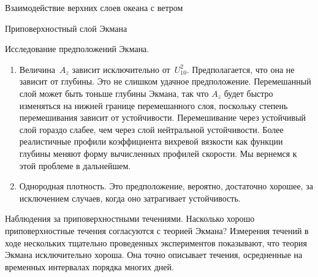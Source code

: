 \begin{chapter}{Взаимодействие верхних слоев океана с ветром}
\begin{section}{Приповерхностный слой Экмана}
\begin{paragraph}{Исследование предположений Экмана.}
\begin{enumerate}
\item Величина~$A_z$ зависит исключительно от~$U^2_{10}$. 
Предполагается, что она не зависит от глубины. Это не слишком удачное 
предположение. Перемешанный слой 
может быть тоньше глубины Экмана, так что $A_z$ будет быстро изменяться
на нижней границе перемешанного слоя, поскольку степень перемешивания
зависит от устойчивости. Перемешивание через устойчивый слой гораздо слабее,
чем через слой нейтральной устойчивости. Более реалистичные профили
коэффициента вихревой вязкости как функции глубины меняют форму вычисленных
профилей скорости. Мы вернемся к этой проблеме в дальнейшем.
%

\item 
Однородная плотность. Это предположение, вероятно, достаточно хорошее,
за исключением случаев, когда оно затрагивает устойчивость.
%
\end{enumerate}
\end{paragraph}

\begin{paragraph}{Наблюдения за приповерхностными течениями.}
Насколько хорошо приповерхностные течения 
согласуются с теорией Экмана? Измерения течений в ходе нескольких тщательно 
проведенных экспериментов показывают, что теория Экмана исключительно хороша.
Она точно описывает течения, осредненные на временных интервалах порядка 
многих дней.
%


\end{paragraph}
\end{section}
\end{chapter}
